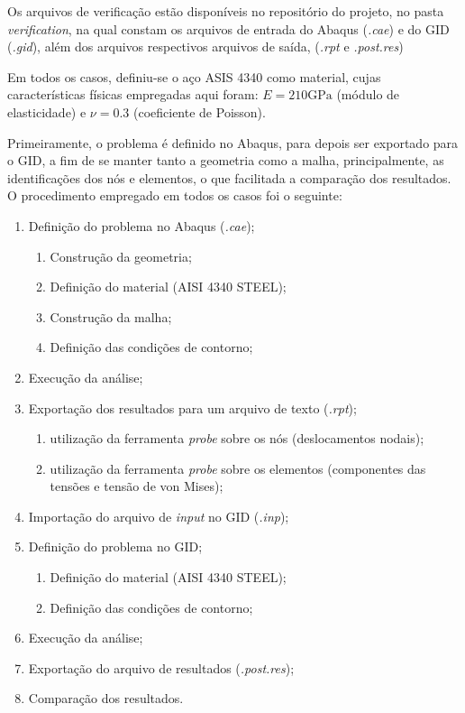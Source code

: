 Os arquivos de verificação estão disponíveis no repositório do projeto, no pasta \emph{verification}, na qual constam os arquivos de entrada do Abaqus (\emph{.cae}) e do GID (\emph{.gid}), além dos arquivos respectivos arquivos de saída, (\emph{.rpt} e \emph{.post.res})

Em todos os casos, definiu-se o aço ASIS 4340 como material, cujas características físicas empregadas aqui foram: $E = 210 \text{GPa}$ (módulo de elasticidade) e $\nu = 0.3$ (coeficiente de Poisson).

Primeiramente, o problema é definido no Abaqus, para depois ser exportado para o GID, a fim de se manter tanto a geometria como a malha, principalmente, as identificações dos nós e elementos, o que facilitada a comparação dos resultados. O procedimento empregado em todos os casos foi o seguinte:

\begin{enumerate}
    \item Definição do problema no Abaqus (\emph{.cae});
    \begin{enumerate}
        \item Construção da geometria;
        \item Definição do material (AISI 4340 STEEL);
        \item Construção da malha;
        \item Definição das condições de contorno;
    \end{enumerate} 
    \item Execução da análise;
    \item Exportação dos resultados para um arquivo de texto (\emph{.rpt});
    \begin{enumerate}
        \item utilização da ferramenta \emph{probe} sobre os nós (deslocamentos nodais);
        \item utilização da ferramenta \emph{probe} sobre os elementos (componentes das tensões e tensão de von Mises);
    \end{enumerate}
    \item Importação do arquivo de \emph{input} no GID (\emph{.inp});
    \item Definição do problema no GID;
    \begin{enumerate}
        \item Definição do material (AISI 4340 STEEL);
        \item Definição das condições de contorno;
    \end{enumerate}
    \item Execução da análise;
    \item Exportação do arquivo de resultados (\emph{.post.res});
    \item Comparação dos resultados.
\end{enumerate}

